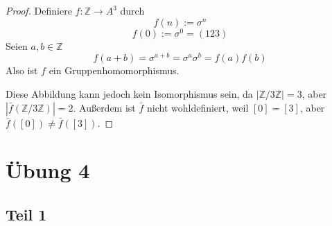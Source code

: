 \documentclass[10pt,a4paper]{article}
\begin{document}
\begin{proof}
  Definiere $f : \mathbb{Z} \rightarrow A^{3}$ durch
  \begin{equation}
    f(n) := \sigma^{n}
  \end{equation}
  \begin{equation}
    f(0) := \sigma^{0} = (123)
  \end{equation}
  Seien $a, b \in \mathbb{Z}$
  \begin{equation}
    f(a + b) = \sigma^{a + b} = \sigma^{a} \sigma^{b} = f(a)f(b)
  \end{equation}
  Also ist $f$ ein Gruppenhomomorphismus.

  Diese Abbildung kann jedoch kein Isomorphismus sein, da $|\mathbb{Z} / 3 \mathbb{Z}| = 3$, aber $|\bar{f}(\mathbb{Z} / 3 \mathbb{Z})| = 2$.
  Außerdem ist $\bar{f}$ nicht wohldefiniert, weil $[0] = [3]$, aber $\bar{f}([0]) \ne \bar{f}([3])$.
\end{proof}

\section{Übung 4}

\subsection{Teil 1}
\end{document}
